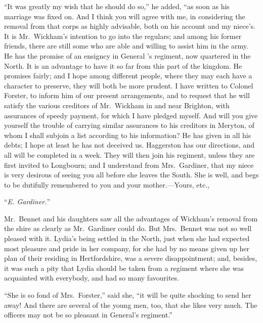 ``It was greatly my wish that he should do so,'' he added, ``as
soon as his marriage was fixed on.  And I think you will agree
with me, in considering the removal from that corps as highly
advisable, both on his account and my niece's.  It is Mr.\ Wickham's
intention to go into the regulars; and among his former friends,
there are still some who are able and willing to assist him in
the army.  He has the promise of an ensigncy in General \gdash{}'s
regiment, now quartered in the North.  It is an advantage to have
it so far from this part of the kingdom.  He promises fairly; and
I hope among different people, where they may each have a character
to preserve, they will both be more prudent.  I have written to
Colonel Forster, to inform him of our present arrangements, and to
request that he will satisfy the various creditors of Mr.\ Wickham
in and near Brighton, with assurances of speedy payment, for which
I have pledged myself.  And will you give yourself the trouble of
carrying similar assurances to his creditors in Meryton, of whom
I shall subjoin a list according to his information?  He has
given in all his debts; I hope at least he has not deceived us.
Haggerston has our directions, and all will be completed in a week.
They will then join his regiment, unless they are first invited to
Longbourn; and I understand from Mrs.\ Gardiner, that my niece is
very desirous of seeing you all before she leaves the South.  She
is well, and begs to be dutifully remembered to you and your
mother.---Yours, etc.,

\medskip
``\emph{E. Gardiner.}''
\bigskip

Mr.\ Bennet and his daughters saw all the advantages of Wickham's
removal from the \gdash{}shire as clearly as Mr.\ Gardiner could do.
But Mrs.\ Bennet was not so well pleased with it.  Lydia's being
settled in the North, just when she had expected most pleasure and
pride in her company, for she had by no means given up her plan
of their residing in Hertfordshire, was a severe disappointment;
and, besides, it was such a pity that Lydia should be taken from
a regiment where she was acquainted with everybody, and had so
many favourites.

``She is so fond of Mrs.\ Forster,'' said she, ``it will be quite
shocking to send her away!  And there are several of the young
men, too, that she likes very much.  The officers may not be so
pleasant in General\gdash{}'s regiment.''

